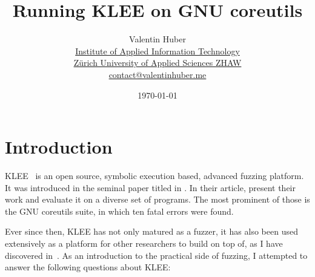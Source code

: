 \documentclass{article}
\title{Running KLEE on GNU coreutils}
\let\savedCite=\cite
\renewcommand{\cite}{\unskip~\savedCite}
\begin{document}
\author{%
    Valentin Huber\vspace{5px}\\%
    \small \href{https://www.zhaw.ch/en/engineering/institutes-centres/init/}{Institute of Applied Information Technology}\\%
    \small \href{https://www.zhaw.ch/en}{Zürich University of Applied Sciences ZHAW}\\%
    \small \href{mailto://contact@valentinhuber.me}{contact@valentinhuber.me}%
    \vspace{10px}
}

\date{\today\vspace{5px}}

\maketitle

\tableofcontents

\section{Introduction}
KLEE\cite{KLEEWebsite} is an open source, symbolic execution based, advanced fuzzing platform. It was introduced in the seminal paper titled  in \citeyear{KLEE}. In their article, \citeauthor{KLEE} present their work and evaluate it on a diverse set of programs. The most prominent of those is the GNU coreutils suite, in which ten fatal errors were found.

Ever since then, KLEE has not only matured as a fuzzer, it has also been used extensively as a platform for other researchers to build on top of, as I have discovered in\cite{EVA}. As an introduction to the practical side of fuzzing, I attempted to answer the following questions about KLEE:
\end{document}
